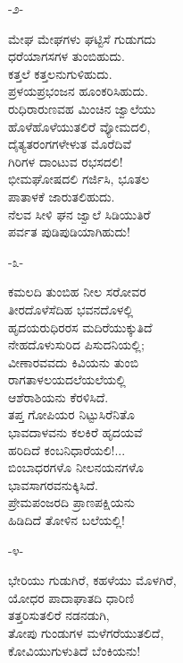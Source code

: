 \begin{center}
-೨-
\end{center}

ಮೇಘ ಮೇಘಗಳು ಘಟ್ಟಿಸೆ ಗುಡುಗದು\\ಧರೆಯಾಗಸಗಳ ತುಂಬಿಹುದು.\\ಕತ್ತಲೆ ಕತ್ತಲನುಗುಳಿಹುದು.\\ಪ್ರಳಯಪ್ರಭಂಜನ ಹೂಂಕರಿಸಿಹುದು.\\ರುಧಿರಾರುಣವಹ ಮಿಂಚಿನ ಜ್ವಾಲೆಯು\\ಹೊಳೆಹೊಳೆಯುತಲಿರೆ ವ್ಯೋಮದಲಿ,\\ದೈತ್ಯತರಂಗಗಳೇಳುತ ಮೊರೆದಿವೆ\\ಗಿರಿಗಳ ದಾಂಟುವ ರಭಸದಲಿ!\\ಭೀಮಘೋಷದಲಿ ಗರ್ಜಿಸಿ, ಭೂತಲ\\ಪಾತಾಳಕೆ ಜಾರುತಲಿಹುದು.\\ನೆಲವ ಸೀಳಿ ಘನ ಜ್ವಾಲೆ ಸಿಡಿಯುತಿರೆ\\ಪರ್ವತ ಪುಡಿಪುಡಿಯಾಗಿಹುದು!

\begin{center}
-೩-
\end{center}

ಕಮಲದಿ ತುಂಬಿಹ ನೀಲ ಸರೋವರ\\ತೀರದೊಳೆಸೆದಿಹ ಭವನದೊಳಲ್ಲಿ\\ಹೃದಯರುಧಿರರಸ ಮದಿರೆಯುಕ್ಕುತಿದೆ\\ನೇಹದೊಳುಸುರಿದ ಪಿಸುದನಿಯಲ್ಲಿ;\\ವೀಣಾರವವದು ಕಿವಿಯನು ತುಂಬಿ\\ರಾಗತಾಳಲಯದಲೆಯಲೆಯಲ್ಲಿ\\ಆಶೆರಾಶಿಯನು ಕೆರಳಿಸಿದೆ.\\ತಪ್ತ ಗೋಪಿಯರ ನಿಟ್ಟುಸಿರೆನಿತೊ\\ಭಾವದಾಳವನು ಕಲಕಿರೆ ಹೃದಯವೆ\\ಹರಿದಿದೆ ಕಂಬನಿಧಾರೆಯಲಿ!...\\ಬಿಂಬಾಧರಗಳೊ ನೀಲನಯನಗಳೊ\\ಭಾವಸಾಗರವನುಕ್ಕಿಸಿದೆ.\\ಪ್ರೇಮಪಂಜರದಿ ಪ್ರಾಣಪಕ್ಷಿಯನು\\ಹಿಡಿದಿದೆ ತೋಳಿನ ಬಲೆಯಲ್ಲಿ!

\begin{center}
-೪-
\end{center}

ಭೇರಿಯು ಗುಡುಗಿರೆ, ಕಹಳೆಯು ಮೊಳಗಿರೆ,\\ಯೋಧರ ಪಾದಾಘಾತದಿ ಧಾರಿಣಿ\\ತತ್ತರಿಸುತಲಿರೆ ನಡನಡುಗಿ,\\ತೋಪು ಗುಂಡುಗಳ ಮಳೆಗರೆಯುತಲಿದೆ,\\ಕೋವಿಯುಗುಳುತಿದೆ ಬೆಂಕಿಯನು!

